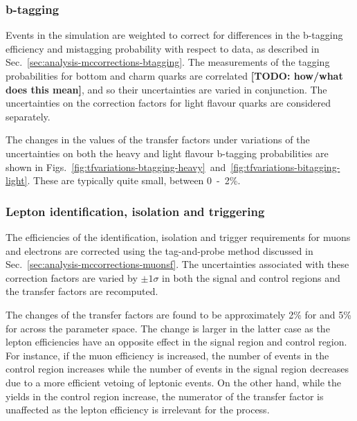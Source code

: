 
\subsubsection{b-tagging}
Events in the simulation are weighted to correct for differences in the 
b-tagging efficiency and mistagging probability with respect to data, as 
described in Sec.~\ref{sec:analysis-mccorrections-btagging}. The measurements 
of the tagging probabilities for bottom and charm quarks are correlated\textbf{ 
[TODO: 
how/what does this mean]}, and so their uncertainties are varied in 
conjunction. 
The uncertainties on the correction factors for light flavour quarks are 
considered separately.

The changes in the values of the transfer factors under variations of the 
uncertainties on both the heavy and light flavour b-tagging probabilities are 
shown in 
Figs.~\ref{fig:tfvariations-btagging-heavy}~and~\ref{fig:tfvariations-bitagging-light}.
 These are typically quite small, between 0~-~2\%.  

\subsubsection{Lepton identification, isolation and triggering}
The efficiencies of the identification, isolation and trigger requirements for 
muons and electrons are corrected using the tag-and-probe method discussed in 
Sec.~\ref{sec:analysis-mccorrections-muonsf}. The uncertainties associated with 
these correction factors are varied by $\pm1\sigma$ in both the signal and 
control regions and the transfer factors are recomputed. 

The changes of the transfer factors are found to be approximately 2\% for 
\Tmumutoz and 5\% for \Tmutottw across the \njnbht parameter space. The change 
is larger in the latter case as the lepton efficiencies have an opposite effect 
in the signal region and \mj control region. For instance, if the muon 
efficiency is increased, the number of events in the \mj control region 
increases while the number of \ttw events in the signal region decreases due to 
a more efficient vetoing of leptonic events. On the other hand, while the 
yields in the \mmj control region increase, the numerator of the \Tmumutoz 
transfer factor is unaffected as the lepton efficiency is irrelevant for the 
\znnj process.

